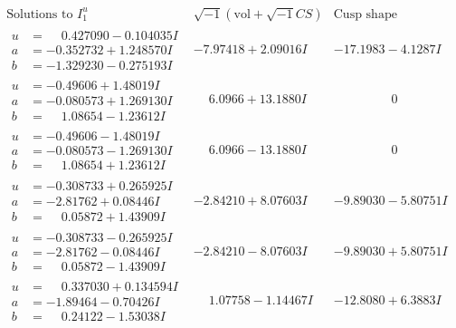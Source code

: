 \documentclass[1p]{elsarticle_modified}
\theoremstyle{definition}
\newcommand{\I}{\sqrt{-1}}
\begin{document}
$$\begin{array}{c|c|c}
 \end{array}$$\newpage$$\begin{array}{c|c|c}  
\text{Solutions to }I^u_{1}& \I (\text{vol} + \sqrt{-1}CS) & \text{Cusp shape}\\
 \hline 
\begin{aligned}
u &= \phantom{-}0.427090 - 0.104035 I \\
a &= -0.352732 + 1.248570 I \\
b &= -1.329230 - 0.275193 I\end{aligned}
 & -7.97418 + 2.09016 I & -17.1983 - 4.1287 I \\ \hline\begin{aligned}
u &= -0.49606 + 1.48019 I \\
a &= -0.080573 + 1.269130 I \\
b &= \phantom{-}1.08654 - 1.23612 I\end{aligned}
 & \phantom{-}6.0966 + 13.1880 I & \phantom{-0.000000 } 0 \\ \hline\begin{aligned}
u &= -0.49606 - 1.48019 I \\
a &= -0.080573 - 1.269130 I \\
b &= \phantom{-}1.08654 + 1.23612 I\end{aligned}
 & \phantom{-}6.0966 - 13.1880 I & \phantom{-0.000000 } 0 \\ \hline\begin{aligned}
u &= -0.308733 + 0.265925 I \\
a &= -2.81762 + 0.08446 I \\
b &= \phantom{-}0.05872 + 1.43909 I\end{aligned}
 & -2.84210 + 8.07603 I & -9.89030 - 5.80751 I \\ \hline\begin{aligned}
u &= -0.308733 - 0.265925 I \\
a &= -2.81762 - 0.08446 I \\
b &= \phantom{-}0.05872 - 1.43909 I\end{aligned}
 & -2.84210 - 8.07603 I & -9.89030 + 5.80751 I \\ \hline\begin{aligned}
u &= \phantom{-}0.337030 + 0.134594 I \\
a &= -1.89464 - 0.70426 I \\
b &= \phantom{-}0.24122 - 1.53038 I\end{aligned}
 & \phantom{-}1.07758 - 1.14467 I & -12.8080 + 6.3883 I \\ \hline\begin{aligned}

\end{aligned}
\end{array}$$
\end{document}

